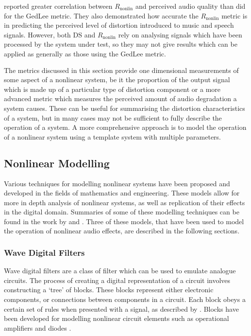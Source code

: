 			\citet{tan2004predicting} reported greater correlation between $R_{\mathrm{nonlin}}$ and perceived
			audio quality than \citet{lee2003auditory} did for the GedLee metric. They also demonstrated how
			accurate the $R_{\mathrm{nonlin}}$ metric is in predicting the perceived level of distortion
			introduced to music and speech signals. However, both $\mathrm{DS}$ and $R_{\mathrm{nonlin}}$ rely
			on analysing signals which have been processed by the system under test, so they may not give
			results which can be applied as generally as those using the GedLee metric.

			The metrics discussed in this section provide one dimensional measurements of some aspect of a
			nonlinear system, be it the proportion of the output signal which is made up of a particular type
			of distortion component or a more advanced metric which measures the perceived amount of audio
			degradation a system causes. These can be useful for summarising the distortion characteristics of
			a system, but in many cases may not be sufficient to fully describe the operation of a system. A
			more comprehensive approach is to model the operation of a nonlinear system using a template system
			with multiple parameters.

	\subsection{Nonlinear Modelling}
	\label{sec:Excitation-Analysis-Modelling}
		Various techniques for modelling nonlinear systems have been proposed and developed in the fields of
		mathematics and engineering. These models allow for more in depth analysis of nonlinear systems, as well as
		replication of their effects in the digital domain. Summaries of some of these modelling techniques can be
		found in the work by \citet{janczak2005identification} and \citet{ogunfunmi2007adaptive}. Three of these
		models, that have been used to model the operation of nonlinear audio effects, are described in the
		following sections.



		\subsubsection{Wave Digital Filters}
			Wave digital filters are a class of filter which can be used to emulate analogue circuits. The
			process of creating a digital representation of a circuit involves constructing a `tree' of blocks.
			These blocks represent either electronic components, or connections between components in a
			circuit.  Each block obeys a certain set of rules when presented with a signal, as described by
			\citet{fettweis1986wave}. Blocks have been developed for modelling nonlinear circuit elements such
			as operational amplifiers and diodes \citep{paiva2012emulation}.

